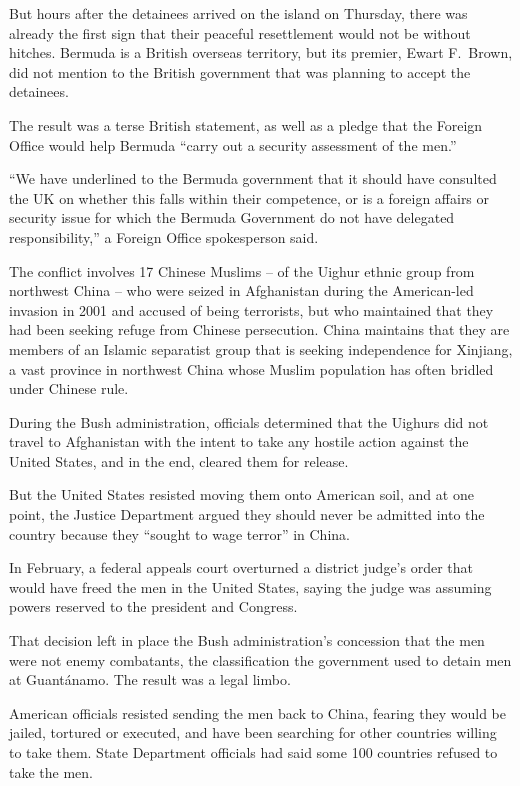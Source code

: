 ﻿\documentclass[12pt,a4paper,onecolumn]{article}
\begin{document}
But hours after the detainees arrived on the island on Thursday, there was already the first sign
that their peaceful resettlement would not be without hitches. Bermuda is a British overseas
territory, but its premier, Ewart F.~Brown, did not mention to the British government that was
planning to accept the detainees.

The result was a terse British statement, as well as a pledge that the Foreign Office would help
Bermuda ``carry out a security assessment of the men.''

``We have underlined to the Bermuda government that it should have consulted the UK on whether this
falls within their competence, or is a foreign affairs or security issue for which the Bermuda
Government do not have delegated responsibility,'' a Foreign Office spokesperson said.

The conflict involves 17 Chinese Muslims -- of the Uighur ethnic group from northwest China -- who
were seized in Afghanistan during the American-led invasion in 2001 and accused of being terrorists,
but who maintained that they had been seeking refuge from Chinese persecution. China maintains that
they are members of an Islamic separatist group that is seeking independence for Xinjiang, a vast
province in northwest China whose Muslim population has often bridled under Chinese rule.

During the Bush administration, officials determined that the Uighurs did not travel to Afghanistan
with the intent to take any hostile action against the United States, and in the end, cleared them
for release.

But the United States resisted moving them onto American soil, and at one point, the Justice
Department argued they should never be admitted into the country because they ``sought to wage
terror'' in China.

In February, a federal appeals court overturned a district judge's order that would have freed the
men in the United States, saying the judge was assuming powers reserved to the president and
Congress.

That decision left in place the Bush administration's concession that the men were not enemy
combatants, the classification the government used to detain men at Guant\'anamo. The result was a
legal limbo.

American officials resisted sending the men back to China, fearing they would be jailed, tortured or
executed, and have been searching for other countries willing to take them. State Department
officials had said some 100 countries refused to take the men.
\end{document}
